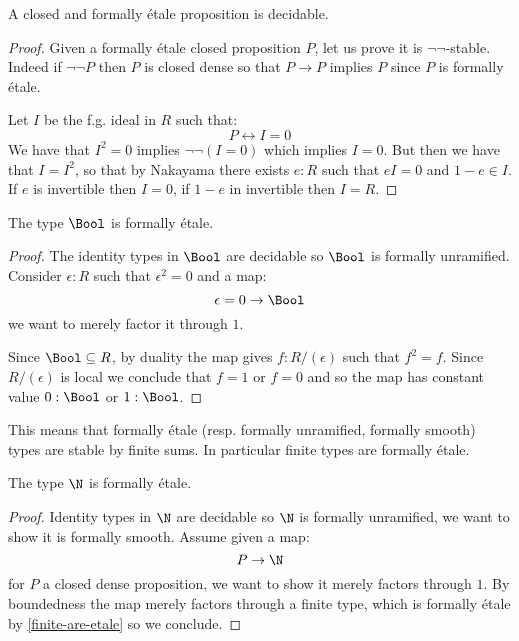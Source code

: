 \begin{lemma}\label{closed-and-etale-decidable}
A closed and formally étale proposition is decidable.
\end{lemma} 

\begin{proof}
Given a formally étale closed proposition $P$, let us prove it is $\neg\neg$-stable. Indeed if $\neg\neg P$ then $P$ is closed dense so that $P\to P$ implies $P$ since $P$ is formally étale. 

Let $I$ be the f.g. ideal in $R$ such that:
\[P\leftrightarrow I=0\]
We have that $I^2=0$ implies $\neg\neg (I=0)$ which implies $I=0$. But then we have that $I=I^2$, so that by Nakayama there exists $e:R$ such that $eI = 0$ and $1-e\in I$. If $e$ is invertible then $I=0$, if $1-e$ in invertible then $I=R$.
\end{proof}

\begin{proposition}\label{bool-is-etale}
  The type $\Bool$ is formally étale.
\end{proposition}

\begin{proof}
The identity types in $\Bool$ are decidable so $\Bool$ is formally unramified. Consider $\epsilon:R$ such that $\epsilon^2=0$ and a map:
\[\epsilon=0 \to \Bool\]
we want to merely factor it through $1$.

 Since $\Bool\subseteq R$, by duality the map gives $f:R/(\epsilon)$ such that $f^2=f$. Since $R/(\epsilon)$ is local we conclude that $f = 1$ or $f=0$ and so the map has constant value $0:\Bool$ or $1:\Bool$.
\end{proof}

\begin{remark}\label{finite-are-etale}
This means that formally étale (resp. formally unramified, formally smooth) types are stable by finite sums. In particular finite types are formally étale.
\end{remark}

\begin{proposition}
The type $\N$ is formally étale.
\end{proposition}

\begin{proof}
Identity types in $\N$ are decidable so $\N$ is formally unramified, we want to show it is formally smooth. Assume given a map:
\[P\to \N\]
for $P$ a closed dense proposition, we want to show it merely factors through $1$. By boundedness the map merely factors through a finite type, which is formally étale by \cref{finite-are-etale} so we conclude.
\end{proof}

